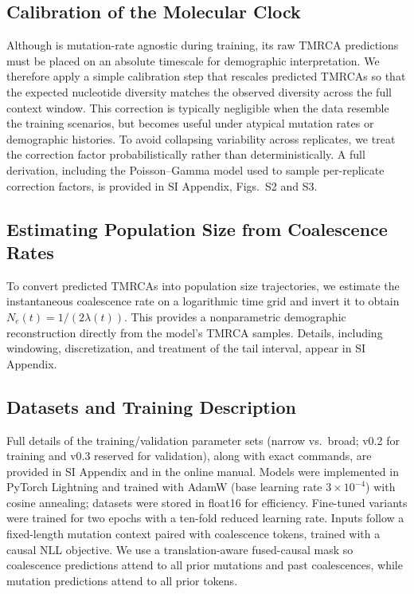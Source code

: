 \documentclass[9pt,twocolumn,twoside]{pnas-new} %
\begin{document}
{\subsection*{Calibration of the Molecular Clock}
\label{correction}

Although \cxtkit is mutation-rate agnostic during training, 
its raw TMRCA predictions must be placed on an absolute timescale for demographic interpretation.
We therefore apply a simple calibration step that rescales predicted TMRCAs 
so that the expected nucleotide diversity matches 
the observed diversity across the full context window. 
This correction is typically negligible when the data resemble the training scenarios, 
but becomes useful under atypical mutation rates or demographic histories. 
To avoid collapsing variability across replicates, 
we treat the correction factor probabilistically rather than deterministically. 
A full derivation, including the Poisson–Gamma model used to sample per-replicate correction factors, 
is provided in SI Appendix, Figs.~S2 and S3.

\subsection*{Estimating Population Size from Coalescence Rates}

To convert predicted TMRCAs into population size trajectories, 
we estimate the instantaneous coalescence rate on a logarithmic time grid 
and invert it to obtain $N_e(t) = 1 / (2\lambda(t))$. 
This provides a nonparametric demographic reconstruction directly from the model's TMRCA samples. 
Details, including windowing, discretization, and treatment of the tail interval, 
appear in SI Appendix.


\subsection*{Datasets and Training Description}
\label{datasets}

Full details of the training/validation parameter sets (narrow vs.\ broad; \stdpopsim v0.2 for training and v0.3 reserved for validation), along with exact commands, are provided in SI Appendix and in the online manual. 
Models were implemented in PyTorch Lightning and trained with AdamW (base learning rate $3\times10^{-4}$) with cosine annealing; datasets were stored in float16 for efficiency. 
Fine-tuned variants were trained for two epochs with a ten-fold reduced learning rate. 
Inputs follow a fixed-length mutation context paired with coalescence tokens, trained with a causal NLL objective. 
We use a translation-aware fused-causal mask so coalescence predictions attend to all prior mutations and past coalescences, while mutation predictions attend to all prior tokens.


}
\end{document}
